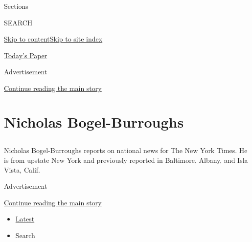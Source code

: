 Sections

SEARCH

\protect\hyperlink{site-content}{Skip to
content}\protect\hyperlink{site-index}{Skip to site index}

\href{https://myaccount.nytimes3xbfgragh.onion/auth/login?response_type=cookie\&client_id=vi}{}

\href{https://www.nytimes3xbfgragh.onion/section/todayspaper}{Today's
Paper}

Advertisement

\protect\hyperlink{after-top}{Continue reading the main story}

\hypertarget{nicholas-bogel-burroughs}{%
\section{Nicholas Bogel-Burroughs}\label{nicholas-bogel-burroughs}}

\subsection{}

Nicholas Bogel-Burroughs reports on national news for The New York
Times. He is from upstate New York and previously reported in Baltimore,
Albany, and Isla Vista, Calif.

Advertisement

\protect\hyperlink{after-mid1}{Continue reading the main story}

\begin{itemize}
\tightlist
\item
  \protect\hyperlink{stream-panel}{Latest}
\item
  Search
\end{itemize}

